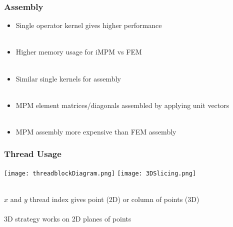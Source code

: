 \documentclass{beamer}
\begin{document}
\begin{frame}
\begin{center}
\frametitle{Assembly}

\begin{itemize}

\item Single operator kernel gives higher performance\\

~\\

\item Higher memory usage for iMPM vs FEM\\

~\\

\item Similar single kernels for assembly\\

~\\

\item MPM element matrices/diagonals assembled by applying unit vectors\\

~\\

\item MPM assembly more expensive than FEM assembly\\

\end{itemize}

\end{center}
\end{frame}


\begin{frame}
\begin{center}
\frametitle{Thread Usage}

\texttt{[image: threadblockDiagram.png]}
\texttt{[image: 3DSlicing.png]}

~\\

$x$ and $y$ thread index gives point (2D) or column of points (3D)\\

~\\

3D strategy works on 2D planes of points\\

\end{center}
\end{frame}
\end{document}
